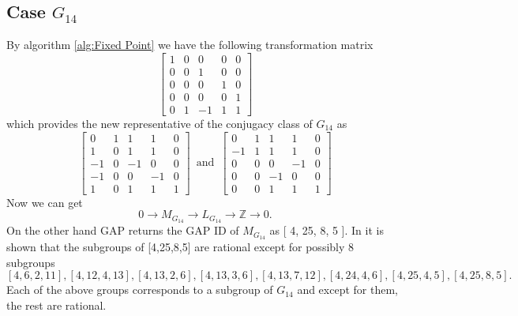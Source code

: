 \documentclass{article}
\theoremstyle{plain}
\theoremstyle{definition}
\newcommand{\Z}{\ensuremath{\mathbb{Z}}}
\newcommand{\tand}{\ensuremath{\,\,\, \text{and} \,\,\,}}
\newcommand{\exactseq}[1]{\ensuremath{0 \longrightarrow M_{#1} \longrightarrow L_{#1} \longrightarrow \Z \longrightarrow 0}}
\begin{document}
\subsection{Case $G_{14}$}
By algorithm \ref{alg:Fixed Point} we have the following transformation matrix 
$$
 \left[ \begin {array}{ccccc} 1&0&0&0&0\\ 0&0&1&0&0
\\ 0&0&0&1&0\\ 0&0&0&0&1
\\ 0&1&-1&1&1\end {array} \right] 
$$
which provides the new representative of the conjugacy class of $G_{14}$ as
$$
\left[ \begin {array}{cccc|c} 0&1&1&1&0\\  1&0&1&1&0
\\  -1&0&-1&0&0\\  -1&0&0&-1&0
\\ \hline 1&0&1&1&1\end {array} \right] 
\tand
 \left[ \begin {array}{cccc|c} 0&1&1&1&0\\  -1&1&1&1&0
\\  0&0&0&-1&0\\  0&0&-1&0&0
\\  \hline 0&0&1&1&1\end {array} \right] 
$$
Now we can get 
$$\exactseq{G_{14}}.$$
On the other hand GAP returns the GAP ID of $M_{G_{14}}$  as [ 4, 25, 8, 5 ].
In \cite{Nicole1} it is shown that the subgroups of [4,25,8,5] are rational except for possibly 8 subgroups $$[4, 6, 2, 11], [4, 12, 4, 13], [4, 13, 2, 6], [4, 13, 3, 6], [4, 13, 7, 12], [4, 24, 4, 6], [4, 25, 4, 5], [4, 25, 8, 5].$$
Each of the above groups corresponds to a subgroup of $G_{14}$ and except for them, the rest are rational.
\\
\\
\end{document}
